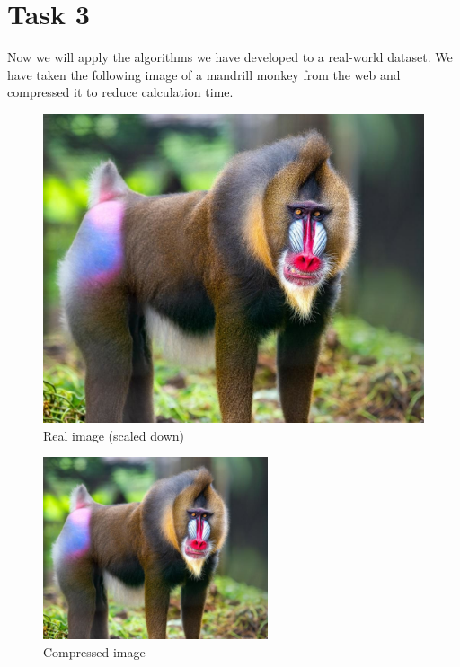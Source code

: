 \documentclass[12pt]{article}
\begin{document}
\section*{Task 3}\label{sec:task-3}
Now we will apply the algorithms we have developed to a real-world dataset.
We have taken the following image of a mandrill monkey from the web and compressed it to reduce calculation time.
\begin{figure}[!h]
    \centering
    \includegraphics[scale=0.4]{images/monkey}
    \caption{Real image (scaled down)}
    \label{fig:real}
\end{figure}
\begin{figure}[!h]
    \centering
    \includegraphics[]{images/monkey_compressed}
    \caption{Compressed image}
    \label{fig:compressed}
\end{figure}
\pagebreak
\end{document}
